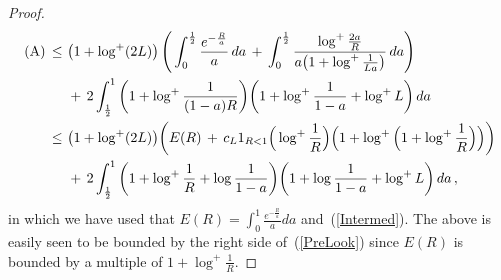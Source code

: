 \documentclass[10pt]{article}
\numberwithin{equation}{section}
\theoremstyle{definition}
\begin{document}
\begin{proof}
\begin{align*}
 \textup{(A)} \,\leq \,&\, \big(1+\log^+(2L) \big)\,\Bigg(\int_0^{\frac{1}{2} } \frac{ e^{-\frac{R}{a}} }{a}\, da \,+\, \int_0^{\frac{1}{2} } \frac{ \log^{+}\frac{2a}{R} }{a\big( 1+ \log^+ \frac{1}{L a} \big)}\, da \Bigg)\nonumber  \\
 &\,+\, 2\int_{\frac{1}{2} }^1 \bigg(1+ \log^+\frac{1}{(1-a)R}\bigg)\bigg(1+\log^+\frac{1}{1-a}+\log^+L \bigg) \, da  \nonumber 
  \\  \,\leq \,&\, \big(1+\log^+ (2L) \big) \bigg( E(R)\,+\,c_L 1_{R< 1 }\Big(\log^+\frac{1}{R}\Big)\Big(1+\log^+\Big(1+\log^+\frac{1}{R}\Big) \Big) \bigg) \nonumber  \\
 &\,+\, 2\int_{\frac{1}{2} }^1 \bigg(1+ \log^+\frac{1}{R}+ \log\frac{1}{1-a} \bigg)\bigg(1+\log\frac{1}{1-a}+\log^+L \bigg) \, da\,,
\end{align*}
in which we have used that $E(R)=\int_0^1\frac{e^{-\frac{R}{a}}  }{a}da$ and~(\ref{Intermed}). The above is easily seen to be bounded by the right side of~(\ref{PreLook}) since  $E(R)$ is bounded by a multiple of $1+\log^+\frac{1}{R}$.\vspace{.1cm}



\end{proof}
\end{document}

